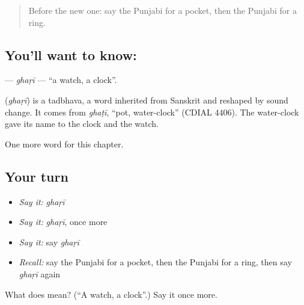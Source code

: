 \label{lesson:PA-C93-ghari}



\begin{quote}
Before the new one: say the Punjabi for a pocket, then the Punjabi for a ring.
\end{quote}

\subsection*{You'll want to know: }
\textbf{} — \emph{ghaṛī} — \textquotedblleft{}a watch, a clock\textquotedblright{}.

\begin{cousinweb}
\textbf{} (\emph{ghaṛī}) is a tadbhava, a word inherited from Sanskrit and reshaped by sound change. It comes from \emph{ghaṭī}, \textquotedblleft{}pot, water-clock\textquotedblright{} (CDIAL 4406). The water-clock gave its name to the clock and the watch.
\end{cousinweb}

\begin{grammarlens}[title={What you've built}]
One more word for this chapter.
\end{grammarlens}

\subsection*{Your turn}
\begin{itemize}
\raggedright
  \item \emph{Say it:} \emph{ghaṛī}
  \item \emph{Say it:} \emph{ghaṛī}, once more
  \item \emph{Say it:} say \emph{ghaṛī}
  \item \emph{Recall:} say the Punjabi for a pocket, then the Punjabi for a ring, then say \emph{ghaṛī} again
\end{itemize}

\begin{tcolorbox}[breakable,colback=teal!4,colframe=teal!35!black,title={Before you move on}]
What does  mean? (\textquotedblleft{}A watch, a clock\textquotedblright{}.) Say it once more.
\end{tcolorbox}

